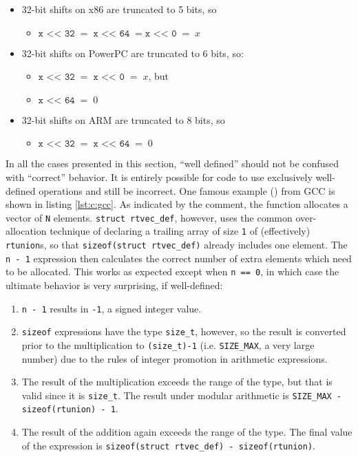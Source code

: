 \begin{itemize}
    \item 32-bit shifts on x86 are truncated to 5 bits, so
        \begin{itemize}
            \item
                $\texttt{x <{}< 32} \; = \; \texttt{x <{}< 64} \; = \texttt{x
                <{}< 0} \; = \; x$
        \end{itemize}
    \item
        32-bit shifts on PowerPC are truncated to 6 bits, so:
        \begin{itemize}
            \item $\texttt{x <{}< 32} \; = \; \texttt{x <{}< 0} \; = \; x$, but
            \item $\texttt{x <{}< 64} \; = \; 0$
        \end{itemize}
    \item
        32-bit shifts on ARM are truncated to 8 bits, so
        \begin{itemize}
            \item $\texttt{x <{}< 32} \; = \; \texttt{x <{}< 64} \; = \; 0$
        \end{itemize}
\end{itemize}

In all the cases presented in this section, ``well defined'' should not be
confused with ``correct'' behavior.  It is entirely possible for code to use
exclusively well-defined operations and still be incorrect.  One famous example
(\cite{Dietz2012}) from GCC is shown in listing \ref{lst:c:gcc}.  As indicated
by the comment, the function allocates a vector of \texttt{N} elements.
\texttt{struct rtvec\_def}, however, uses the common over-allocation technique
of declaring a trailing array of size \texttt{1} of (effectively)
\texttt{rtunion}s, so that \texttt{sizeof(struct rtvec\_def)} already includes
one element.  The \texttt{n - 1} expression then calculates the correct number
of extra elements which need to be allocated.  This works as expected except
when \texttt{n == 0}, in which case the ultimate behavior is very surprising, if
well-defined:

\begin{enumerate}
    \item \texttt{n - 1} results in \texttt{-1}, a signed integer value.
    \item
        \texttt{sizeof} expressions have the type \texttt{size\_t}, however, so
        the result is converted prior to the multiplication to
        \texttt{(size\_t)-1} (i.e.  \texttt{SIZE\_MAX}, a very large number) due
        to the rules of integer promotion in arithmetic expressions.
    \item
        The result of the multiplication exceeds the range of the type, but that
        is valid since it is \texttt{size\_t}.  The result under modular
        arithmetic is \texttt{SIZE\_MAX - sizeof(rtunion) - 1}.
    \item
        The result of the addition again exceeds the range of the type.  The
        final value of the expression is \texttt{sizeof(struct rtvec\_def) -
        sizeof(rtunion)}.
\end{enumerate}

